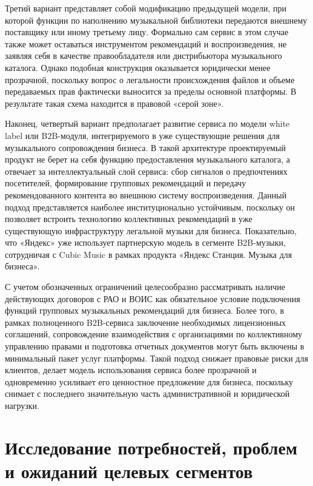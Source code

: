 Третий вариант представляет собой модификацию предыдущей модели, при которой функции по наполнению музыкальной библиотеки передаются внешнему поставщику или иному третьему лицу. Формально сам сервис в этом случае также может оставаться инструментом рекомендаций и воспроизведения, не заявляя себя в качестве правообладателя или дистрибьютора музыкального каталога. Однако подобная конструкция оказывается юридически менее прозрачной, поскольку вопрос о легальности происхождения файлов и объеме передаваемых прав фактически выносится за пределы основной платформы. В результате такая схема находится в правовой «серой зоне».

Наконец, четвертый вариант предполагает развитие сервиса по модели white label или B2B-модуля, интегрируемого в уже существующие решения для музыкального сопровождения бизнеса. В такой архитектуре проектируемый продукт не берет на себя функцию предоставления музыкального каталога, а отвечает за интеллектуальный слой сервиса: сбор сигналов о предпочтениях посетителей, формирование групповых рекомендаций и передачу рекомендованного контента во внешнюю систему воспроизведения. Данный подход представляется наиболее институционально устойчивым, поскольку он позволяет встроить технологию коллективных рекомендаций в уже существующую инфраструктуру легальной музыки для бизнеса. Показательно, что «Яндекс» уже использует партнерскую модель в сегменте B2B-музыки, сотрудничая с Cubic Music в рамках продукта «Яндекс Станция. Музыка для бизнеса».

С учетом обозначенных ограничений целесообразно рассматривать наличие действующих договоров с РАО и ВОИС как обязательное условие подключения функций групповых музыкальных рекомендаций для бизнеса. Более того, в рамках полноценного B2B-сервиса заключение необходимых лицензионных соглашений, сопровождение взаимодействия с организациями по коллективному управлению правами и подготовка отчетных документов могут быть включены в минимальный пакет услуг платформы. Такой подход снижает правовые риски для клиентов, делает модель использования сервиса более прозрачной и одновременно усиливает его ценностное предложение для бизнеса, поскольку снимает с последнего значительную часть административной и юридической нагрузки.

\section{Исследование потребностей, проблем и ожиданий целевых сегментов}
\label{sec:market:needs}

